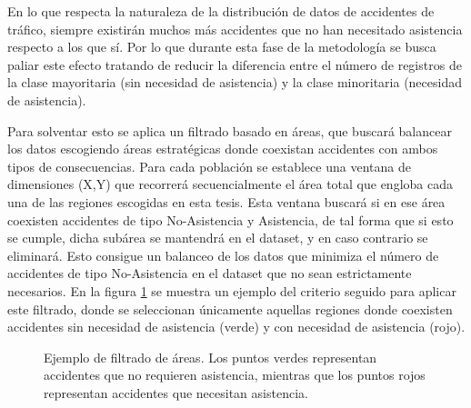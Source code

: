 \documentclass{uathesis-es}
\begin{document}
	En lo que respecta la naturaleza de la distribución de datos de accidentes de tráfico, siempre existirán muchos más accidentes que no han necesitado asistencia respecto a los que sí. Por lo que durante esta fase de la metodología se busca paliar este efecto tratando de reducir la diferencia entre el número de registros de la clase mayoritaria (sin necesidad de asistencia) y la clase minoritaria (necesidad de asistencia).
	
	Para solventar esto se aplica un filtrado basado en áreas, que buscará balancear los datos escogiendo áreas estratégicas donde coexistan accidentes con ambos tipos de consecuencias. Para cada población se establece una ventana de dimensiones (X,Y) que recorrerá secuencialmente el área total que engloba cada una de las regiones escogidas en esta tesis. Esta ventana buscará si en ese área coexisten accidentes de tipo No-Asistencia y Asistencia, de tal forma que si esto se cumple, dicha subárea se mantendrá en el dataset, y en caso contrario se eliminará. Esto consigue un balanceo de los datos que minimiza el número de accidentes de tipo No-Asistencia en el dataset que no sean estrictamente necesarios. En la figura \ref{Areas} se muestra un ejemplo del criterio seguido para aplicar este filtrado, donde se seleccionan únicamente aquellas regiones donde coexisten accidentes sin necesidad de asistencia (verde) y con necesidad de asistencia (rojo).
	
	\begin{figure}[H]
		\centering    
		\caption{Ejemplo de filtrado de áreas. Los puntos verdes representan accidentes que no requieren asistencia, mientras que los puntos rojos representan accidentes que necesitan asistencia.}
		\label{Areas}
	\end{figure}
	
\end{document}
